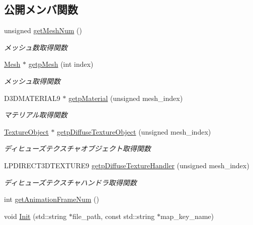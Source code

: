 \subsection*{公開メンバ関数}
\begin{DoxyCompactItemize}
\item 
unsigned \mbox{\hyperlink{class_md_bin_object_ad9fc54c8502548da439028d8a05b655c}{get\+Mesh\+Num}} ()
\begin{DoxyCompactList}\small\item\em メッシュ数取得関数 \end{DoxyCompactList}\item 
\mbox{\hyperlink{class_md_bin_object_1_1_mesh}{Mesh}} $\ast$ \mbox{\hyperlink{class_md_bin_object_ac1ac8fd593b33e3e1e4f6751bc42f758}{getp\+Mesh}} (int index)
\begin{DoxyCompactList}\small\item\em メッシュ取得関数 \end{DoxyCompactList}\item 
D3\+D\+M\+A\+T\+E\+R\+I\+A\+L9 $\ast$ \mbox{\hyperlink{class_md_bin_object_af4e4d4d4678c14e42bfb578c46ed49bc}{getp\+Material}} (unsigned mesh\+\_\+index)
\begin{DoxyCompactList}\small\item\em マテリアル取得関数 \end{DoxyCompactList}\item 
\mbox{\hyperlink{class_texture_object}{Texture\+Object}} $\ast$ \mbox{\hyperlink{class_md_bin_object_a0d6c63cef9e65ec57a23a7e79eccf79d}{getp\+Diffuse\+Texture\+Object}} (unsigned mesh\+\_\+index)
\begin{DoxyCompactList}\small\item\em ディヒューズテクスチャオブジェクト取得関数 \end{DoxyCompactList}\item 
L\+P\+D\+I\+R\+E\+C\+T3\+D\+T\+E\+X\+T\+U\+R\+E9 \mbox{\hyperlink{class_md_bin_object_af659a711251cd6689a883ca695117009}{getp\+Diffuse\+Texture\+Handler}} (unsigned mesh\+\_\+index)
\begin{DoxyCompactList}\small\item\em ディヒューズテクスチャハンドラ取得関数 \end{DoxyCompactList}\item 
int \mbox{\hyperlink{class_md_bin_object_a6cd46639b15073908c494c124016157e}{get\+Animation\+Frame\+Num}} ()
\item 
void \mbox{\hyperlink{class_md_bin_object_a10059d81505165733dd6d078c63667ac}{Init}} (std\+::string $\ast$file\+\_\+path, const std\+::string $\ast$map\+\_\+key\+\_\+name)

\end{DoxyCompactItemize}
